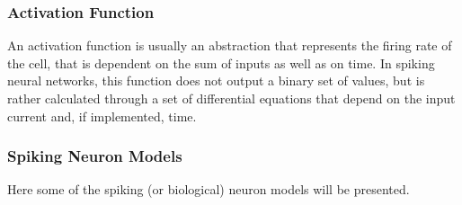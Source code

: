 \subsubsection{Activation Function}

An activation function is usually an abstraction that represents the firing rate of the cell, that is dependent on the sum of inputs as well as on time.\cite{ActFunc} In spiking neural networks,
this function does not output a binary set of values, but is rather calculated through a set of differential equations that depend on the input current and, if implemented, time.

\subsubsection{Spiking Neuron Models}

Here some of the spiking (or biological) neuron models will be presented.

